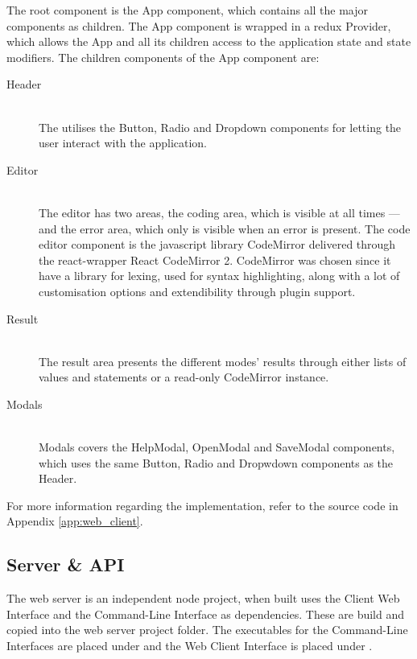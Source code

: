 The root component is the App component, which contains all the major components as children.
The App component is wrapped in a redux Provider, which allows the App and all its children access to the application state and state modifiers.
The children components of the App component are:

\begin{description}

  \item[Header]~\\
    The utilises the Button, Radio and Dropdown components for letting the user interact with the application.

  \item[Editor]~\\
    The editor has two areas, the coding area, which is visible at all times --- and the error area, which only is visible when an error is present.
    The code editor component is the javascript library CodeMirror \cite{CM} delivered through the react-wrapper React CodeMirror 2.
    CodeMirror was chosen since it have a library for lexing, used for syntax highlighting, along with a lot of customisation options and extendibility through plugin support.

  \item[Result]~\\
    The result area presents the different modes' results through either lists of values and statements or a read-only CodeMirror instance.

  \item[Modals]~\\
    Modals covers the HelpModal, OpenModal and SaveModal components, which uses the same Button, Radio and Dropwdown components as the Header.

\end{description}

For more information regarding the implementation, refer to the source code in Appendix \ref{app:web_client}.



\subsection{Server \& API}
\label{sec:server_and_api}

The web server is an independent node project, when built uses the Client Web Interface and the Command-Line Interface as dependencies.
These are build and copied into the web server project folder.
The executables for the Command-Line Interfaces are placed under  and the Web Client Interface is placed under .

